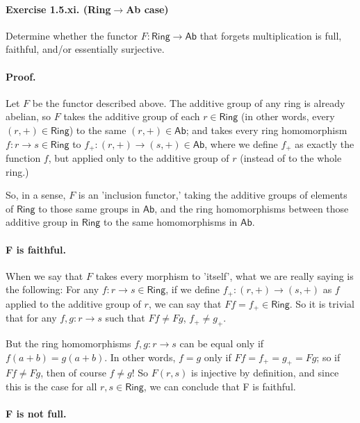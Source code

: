 \documentclass[main.tex]{subfiles}
\begin{document}
	\paragraph{Exercise 1.5.xi. (Ring$ \to $Ab case)} Determine whether the functor \(F \colon \textsf{Ring} \to \textsf{Ab}\) that forgets multiplication is full, faithful, and/or essentially surjective.
	
	\paragraph{Proof.} Let \(F\) be the functor described above. The additive group of any ring is already abelian, so \(F\)  takes the additive group of each \(r \in \textsf{Ring}\) (in other words, every \((r, +) \in \textsf{Ring}\)) to the same \((r, +) \in \textsf{Ab}\); and takes every ring homomorphism \(f \colon r \to s \in \textsf{Ring}\) to \(f_+ \colon (r, +) \to (s, +) \in \textsf{Ab}\),  where we define \(f_+\) as exactly the function \(f\), but applied only to the additive group of \(r\) (instead of to the whole ring.) 
	
	So, in a sense, \(F\) is an 'inclusion functor,' taking the additive groups of elements of \(\textsf{Ring}\) to those same groups in \(\textsf{Ab}\), and the ring homomorphisms between those additive group in \(\textsf{Ring}\) to the same homomorphisms in \(\textsf{Ab}\).
	
	\paragraph{F is faithful.}	
	
	When we say that \(F\) takes every morphism to 'itself', what we are really saying is the following: For any \(f \colon r \to s \in \textsf{Ring}\), if we define \(f_+ \colon (r, +) \to (s, +)\) as \(f\) applied to the additive group of \(r\), we can say that \(Ff = f_+\in \textsf{Ring}\). So it is trivial that for any \(f, g \colon r \to s\) such that \(Ff \neq Fg\), \(f_+ \neq g_+\). 

	But the ring homomorphisms \(f, g \colon r \to s\) can be equal only if \(f(a+b) = g(a+b)\). In other words, \(f = g \) only if \(Ff = f_+ = g_+ = Fg\); so if \(Ff \neq Fg\), then of course \(f \neq g \)! So \(F(r, s)\) is injective by definition, and since this is the case for all \(r, s \in \textsf{Ring}\), we can conclude that F is faithful.

	\paragraph{F is not full.}	
	
\end{document}
